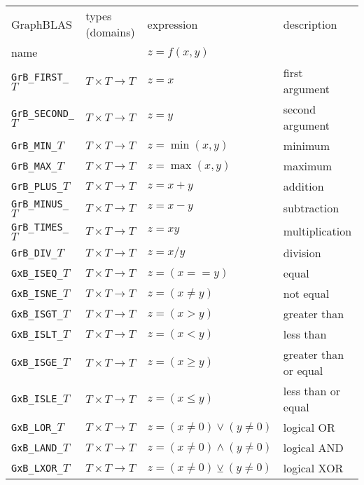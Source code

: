 \documentclass[12pt]{article}
\begin{document}
\vspace{0.2in}
{\footnotesize
\begin{tabular}{llll}
\hline
GraphBLAS             & types (domains)            & expression      & description \\
name                  &                            & $z=f(x,y)$      & \\
\hline
\verb'GrB_FIRST_'$T$  & $T \times T \rightarrow T$ & $z = x$         & first argument \\
\verb'GrB_SECOND_'$T$ & $T \times T \rightarrow T$ & $z = y$         & second argument \\
\verb'GrB_MIN_'$T$    & $T \times T \rightarrow T$ & $z = \min(x,y)$ & minimum \\
\verb'GrB_MAX_'$T$    & $T \times T \rightarrow T$ & $z = \max(x,y)$ & maximum \\
\verb'GrB_PLUS_'$T$   & $T \times T \rightarrow T$ & $z = x+y$       & addition \\
\verb'GrB_MINUS_'$T$  & $T \times T \rightarrow T$ & $z = x-y$       & subtraction \\
\verb'GrB_TIMES_'$T$  & $T \times T \rightarrow T$ & $z = xy$        & multiplication \\
\verb'GrB_DIV_'$T$    & $T \times T \rightarrow T$ & $z = x/y$       & division \\
\hline
\verb'GxB_ISEQ_'$T$   & $T \times T \rightarrow T$ & $z = (x == y)$  & equal \\
\verb'GxB_ISNE_'$T$   & $T \times T \rightarrow T$ & $z = (x \ne y)$ & not equal \\
\verb'GxB_ISGT_'$T$   & $T \times T \rightarrow T$ & $z = (x >   y)$ & greater than \\
\verb'GxB_ISLT_'$T$   & $T \times T \rightarrow T$ & $z = (x <   y)$ & less than  \\
\verb'GxB_ISGE_'$T$   & $T \times T \rightarrow T$ & $z = (x \ge y)$ & greater than or equal \\
\verb'GxB_ISLE_'$T$   & $T \times T \rightarrow T$ & $z = (x \le y)$ & less than or equal  \\
\hline
\verb'GxB_LOR_'$T$    & $T \times T \rightarrow T$ & $z = (x \ne 0) \vee    (y \ne 0) $ & logical OR \\
\verb'GxB_LAND_'$T$   & $T \times T \rightarrow T$ & $z = (x \ne 0) \wedge  (y \ne 0) $ & logical AND \\
\verb'GxB_LXOR_'$T$   & $T \times T \rightarrow T$ & $z = (x \ne 0) \veebar (y \ne 0) $ & logical XOR \\
\hline
\end{tabular}
}
\vspace{0.2in}
\end{document}
